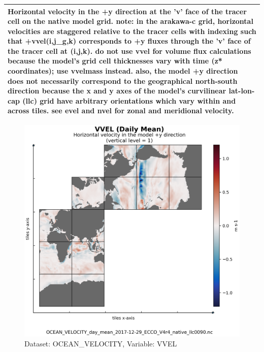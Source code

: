 \begin{longtable}{|m{}|m{}|m{}|m{}|}
\multicolumn{4}{|p{1\textwidth}|}{\footnotesize{{Horizontal velocity in the +y direction at the 'v' face of the tracer cell on the native model grid. note: in the arakawa-c grid, horizontal velocities are staggered relative to the tracer cells with indexing such that +vvel(i,j\_g,k) corresponds to +y fluxes through the 'v' face of the tracer cell at (i,j,k). do not use vvel for volume flux calculations because the model's grid cell thicknesses vary with time (z* coordinates); use vvelmass instead. also, the model +y direction does not necessarily correspond to the geographical north-south direction because the x and y axes of the model's curvilinear lat-lon-cap (llc) grid have arbitrary orientations which vary within and across tiles. see evel and nvel for zonal and meridional velocity.}}} \\ \hline
\end{longtable}

\begin{figure}[H]
\centering
\includegraphics[scale=0.55]{../images/plots/native_plots/Ocean_Velocity/VVEL.png}
\caption{Dataset: OCEAN\_VELOCITY, Variable: VVEL}
\label{tab:table-OCEAN_VELOCITY_VVEL-Plot}
\end{figure}
\newpage
\pagebreak
